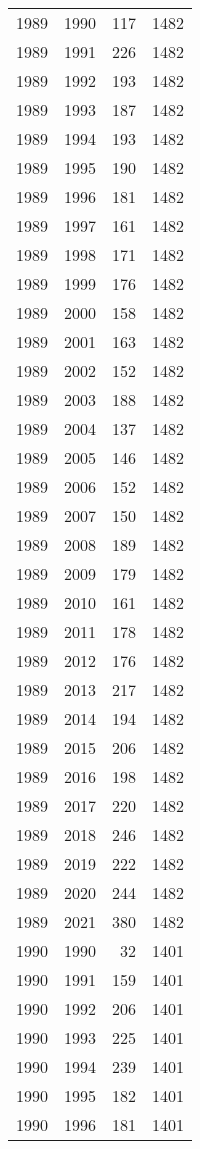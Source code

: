 \documentclass[
  10pt,
  letterpaper,
  DIV=11,
  numbers=noendperiod,
  twoside]{scrartcl}
\begin{document}
\begin{longtable}[]{@{}rrrr@{}}
1989 & 1990 & 117 & 1482 \\
1989 & 1991 & 226 & 1482 \\
1989 & 1992 & 193 & 1482 \\
1989 & 1993 & 187 & 1482 \\
1989 & 1994 & 193 & 1482 \\
1989 & 1995 & 190 & 1482 \\
1989 & 1996 & 181 & 1482 \\
1989 & 1997 & 161 & 1482 \\
1989 & 1998 & 171 & 1482 \\
1989 & 1999 & 176 & 1482 \\
1989 & 2000 & 158 & 1482 \\
1989 & 2001 & 163 & 1482 \\
1989 & 2002 & 152 & 1482 \\
1989 & 2003 & 188 & 1482 \\
1989 & 2004 & 137 & 1482 \\
1989 & 2005 & 146 & 1482 \\
1989 & 2006 & 152 & 1482 \\
1989 & 2007 & 150 & 1482 \\
1989 & 2008 & 189 & 1482 \\
1989 & 2009 & 179 & 1482 \\
1989 & 2010 & 161 & 1482 \\
1989 & 2011 & 178 & 1482 \\
1989 & 2012 & 176 & 1482 \\
1989 & 2013 & 217 & 1482 \\
1989 & 2014 & 194 & 1482 \\
1989 & 2015 & 206 & 1482 \\
1989 & 2016 & 198 & 1482 \\
1989 & 2017 & 220 & 1482 \\
1989 & 2018 & 246 & 1482 \\
1989 & 2019 & 222 & 1482 \\
1989 & 2020 & 244 & 1482 \\
1989 & 2021 & 380 & 1482 \\
1990 & 1990 & 32 & 1401 \\
1990 & 1991 & 159 & 1401 \\
1990 & 1992 & 206 & 1401 \\
1990 & 1993 & 225 & 1401 \\
1990 & 1994 & 239 & 1401 \\
1990 & 1995 & 182 & 1401 \\
1990 & 1996 & 181 & 1401 \\

\end{longtable}
\end{document}
